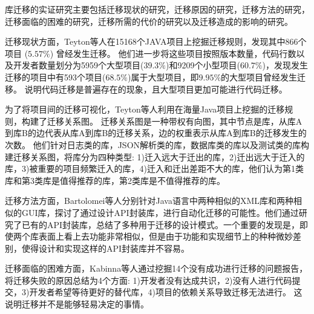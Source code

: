 \documentclass[UTF8]{ctexart}
\begin{document}
库迁移的实证研究主要包括迁移现状的研究，迁移原因的研究，迁移方法的研究，迁移面临的困难的研究，迁移所需的代价的研究以及迁移造成的影响的研究。

迁移现状方面，Teyton等人\cite{2014JournalOfSysAndSoft-Teyton-Study}在15168个JAVA项目上挖掘迁移规则，发现其中866个项目	($5.57\%$) 曾经发生迁移。
他们进一步将这些项目按照版本数量，代码行数以及开发者数量划分为5959个大型项目($39.3\%$)和9209个小型项目($60.7\%$)，发现发生迁移的项目中有593个项目($68.5\%$)属于大型项目，即$9.95\%$的大型项目曾经发生迁移。
说明代码迁移是普遍存在的现象，且大型项目更加可能进行代码迁移。

为了将项目间的迁移可视化，Teyton等人\cite{2012WCRE-Teyton-Mining, 2014JournalOfSysAndSoft-Teyton-Study}利用在海量Java项目上挖掘的迁移规则，构建了迁移关系图。
迁移关系图是一种带权有向图，其中节点是库，从库A到库B的边代表从库A到库B的迁移关系，边的权重表示从库A到库B的迁移发生的次数。
他们针对日志类的库，JSON解析类的库，数据库类的库以及测试类的库构建迁移关系图，将库分为四种类型: 1)迁入远大于迁出的库，2)迁出远大于迁入的库，3)被重要的项目频繁迁入的库，4)迁入和迁出差距不大的库，他们认为第1类库和第3类库是值得推荐的库，第2类库是不值得推荐的库。



迁移方法方面，Bartolomei等人\cite{2009SLE-Bartolomei-Study, 2010ICSM-Bartolomei-Swing}分别针对Java语言中两种相似的XML库和两种相似的GUI库，探讨了通过设计API封装库，进行自动化迁移的可能性。他们通过研究了已有的API封装库，总结了多种用于迁移的设计模式。一个重要的发现是，即使两个库表面上看上去功能非常相似，但是由于功能和实现细节上的种种微妙差别，使得设计和实现这样的API封装库并不容易。

迁移面临的困难方面，Kabinna等人\cite{2016MSR-Kabinna-Logging}通过挖掘14个没有成功进行迁移的问题报告，将迁移失败的原因总结为4个方面: 1)开发者没有达成共识，2)没有人进行代码提交，3)开发者希望等待更好的替代库，4)项目的依赖关系导致迁移无法进行。
这说明迁移并不是能够轻易决定的事情。
\end{document}
